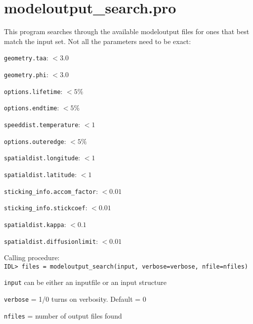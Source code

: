 \documentclass[11pt]{article}
\begin{document}
\section{modeloutput\_search.pro}

\begin{compactenum}
\item This program searches through the available modeloutput files for ones 
that best match the input set. Not all the parameters need to be exact:
  \begin{compactenum}[(a)]
  \item \texttt{geometry.taa}: $< 3.0$\degr
  \item \texttt{geometry.phi}: $< 3.0$\degr
  \item \texttt{options.lifetime}: $< 5\%$
  \item \texttt{options.endtime}: $< 5\%$
  \item \texttt{speeddist.temperature}: $<1$\degr
  \item \texttt{options.outeredge}: $< 5\%$
  \item \texttt{spatialdist.longitude}: $<1$\degr
  \item \texttt{spatialdist.latitude}: $<1$\degr
  \item \texttt{sticking\_info.accom\_factor}: $<0.01$
  \item \texttt{sticking\_info.stickcoef}: $< 0.01$
  \item \texttt{spatialdist.kappa}: $<0.1$
\item \texttt{spatialdist.diffusionlimit}: $<0.01$
\end{compactenum}

\item Calling procedure: \\
\texttt{IDL> files = modeloutput\_search(input, verbose=verbose, nfile=nfiles)}
  \begin{compactenum}
  \item \texttt{input} can be either an inputfile or an input structure
  \item \texttt{verbose} = 1/0 turns on verbosity. Default = 0
  \item \texttt{nfiles} = number of output files found
  \end{compactenum}
\end{compactenum}
\end{document}
